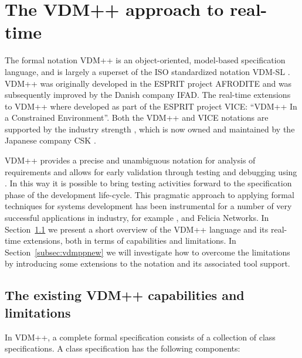 \section{The VDM++ approach to real-time}
\label{sec:vdmpp}

The formal notation VDM++ is an object-oriented, model-based specification
language, and is largely a superset of the ISO standardized notation VDM-SL
\cite{ISOVDM95}. VDM++ was originally developed in the ESPRIT project
\textsc{AFRODITE} and was subsequently improved by the Danish company
IFAD. The real-time extensions to VDM++ where developed as part of the
ESPRIT project \textsc{VICE}: ``VDM++ In a Constrained Environment''.
Both the VDM++ and VICE notations are supported by the industry strength
\vdmtools, which is now owned and maintained by the Japanese
company CSK \cite{CskVdmHome}.

VDM++ provides a precise and unambiguous notation for
analysis of requirements and allows for early validation through testing
and debugging using \vdmtools. In this way it is possible to bring
testing activities forward to the specification phase of the
development life-cycle. This pragmatic approach to applying formal
techniques for systems development has been instrumental for a number
of very successful applications in industry, for example \cite{Berg&99a},
\cite{Horl&00b} and Felicia Networks. In Section~\ref{subsec:vdmppold}
we present a short overview of the VDM++ language and its real-time
extensions, both in terms of capabilities and limitations.
In Section~\ref{subsec:vdmppnew} we will investigate how to overcome
the limitations by introducing some extensions to the notation and its 
associated tool support.

\subsection{The existing VDM++ capabilities and limitations}
\label{subsec:vdmppold}

In VDM++, a complete formal specification consists of a collection of 
class specifications. A class specification has the following components:

